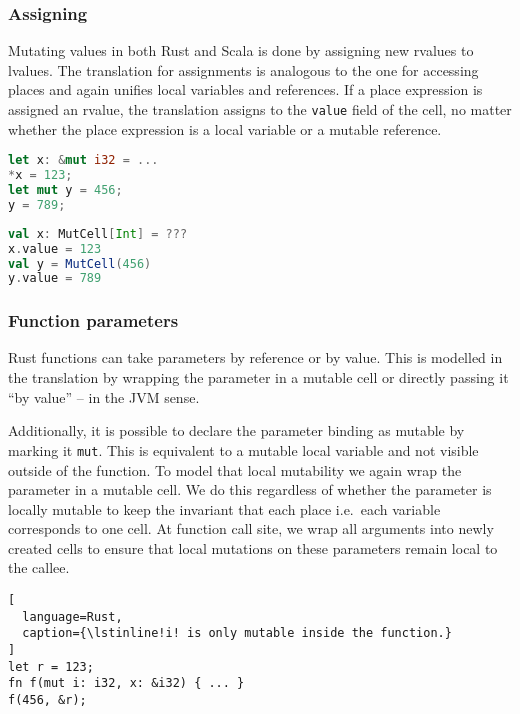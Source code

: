\subsubsection{Assigning}

Mutating values in both Rust and Scala is done by assigning new rvalues
to lvalues. The translation for assignments is analogous to the one for
accessing places and again unifies local variables and references. If a
place expression is assigned an rvalue, the translation assigns to the
\passthrough{\lstinline!value!} field of the cell, no matter whether the
place expression is a local variable or a mutable reference.

\noindent\begin{minipage}[t]{.45\textwidth}
\begin{lstlisting}[language=Rust]
let x: &mut i32 = ...
*x = 123;
let mut y = 456;
y = 789;
\end{lstlisting}
\end{minipage}\hfill
\begin{minipage}[t]{.45\textwidth}
\begin{lstlisting}[language=Scala]
val x: MutCell[Int] = ???
x.value = 123
val y = MutCell(456)
y.value = 789
\end{lstlisting}
\end{minipage}

\subsubsection{Function parameters}

Rust functions can take parameters by reference or by value. This is modelled in
the translation by wrapping the parameter in a mutable cell or directly passing
it ``by value'' -- in the JVM sense.

Additionally, it is possible to declare the parameter binding as mutable
by marking it \passthrough{\lstinline!mut!}. This is equivalent to a
mutable local variable and not visible outside of the function. To model
that local mutability we again wrap the parameter in a mutable cell. We
do this regardless of whether the parameter is locally mutable to keep
the invariant that each place i.e.~each variable corresponds to one
cell. At function call site, we wrap all arguments into newly created
cells to ensure that local mutations on these parameters remain local to
the callee.

\begin{lstlisting}[
  language=Rust,
  caption={\lstinline!i! is only mutable inside the function.}
]
let r = 123;
fn f(mut i: i32, x: &i32) { ... }
f(456, &r);
\end{lstlisting}


